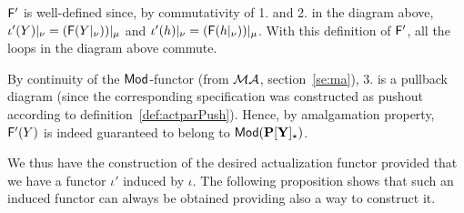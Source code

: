 ${\sf {F'}}$ is well-defined since, by commutativity of 1. and 2. in the diagram
above, $\iota'(Y)|_{\nu} =
({\sf {F}}(Y|_\nu))|_{\mu}$ and $\iota'(h)|_{\nu} = ({\sf {F}}(h|_\nu))|_{\mu}$.
With this definition of ${\sf {F}}'$, all the loops
in the diagram  above commute. 
%

By continuity of the ${\sf {Mod}}$-functor (from ${\mathcal{MA}}$, section~\ref{se:ma}), 3. is a pullback
diagram (since the corresponding specification was constructed as pushout
according to definition~\ref{def:actparPush}). Hence, by amalgamation
property, ${\sf {F}}'(Y)$ is indeed guaranteed to belong to
${\sf {Mod}}({\bf P[Y]_\star})$. 

We thus have the construction of the desired actualization functor provided
that we have a functor $\iota'$ induced by $\iota$. The following proposition
shows that such an induced functor can always be obtained providing also a
way to construct it.

